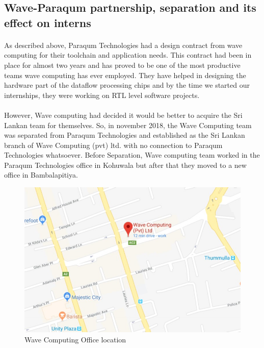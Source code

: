 \subsection{Wave-Paraqum partnership, separation and its effect on interns}

\paragraph{}
As described above, Paraqum Technologies had a design contract from wave computing for their toolchain and application needs. This contract had been in place for almost two years and has proved to be one of the most productive teams wave computing has ever employed. They have helped in designing the hardware part of the dataflow processing chips and by the time we started our internships, they were working on RTL level software projects.

\paragraph{}
However, Wave computing had decided it would be better to acquire the Sri Lankan team for themselves. So, in november 2018, the Wave Computing team was separated from Paraqum Technologies and established as the Sri Lankan branch of Wave Computing (pvt) ltd. with no connection to Paraqum Technologies whatsoever. Before Separation, Wave computing team worked in the Paraqum Technologies office in Kohuwala but after that they moved to a new office in Bambalapitiya.

\begin{figure}[h]
    \centering
    \includegraphics[trim=0cm 0cm 0cm 0cm, clip=true,scale=0.25]{figures/wave_location.jpg}
    \caption{Wave Computing Office location \label{Fig:pqmteam}}\vspace{-4mm}
    \end{figure}

